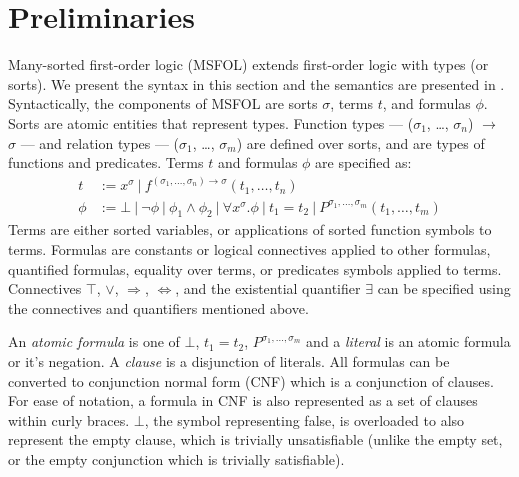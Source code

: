\documentclass[11pt]{article}
\begin{document}
\section{Preliminaries}
\label{sec:prelims}
	Many-sorted first-order logic (MSFOL)
	extends first-order logic with 
	types (or sorts). We present the 
	syntax in this section and the 
	semantics are presented in
	\cite{Barrett2018}. Syntactically, 
	the components of MSFOL are sorts 
	$\sigma$, terms $t$, and 
	formulas $\phi$. Sorts are 
	atomic entities that 
	represent types. Function types 
	--- ($\sigma_1$, \ldots, $\sigma_n$) 
	$\to$ $\sigma$ ---
	and relation types 
	--- ($\sigma_1$, \ldots, $\sigma_m$)
	are defined over sorts, and 
	are types of functions and 
	predicates. Terms $t$ and 
	formulas $\phi$ are specified as:
	\begin{align*}
	t &:= x^{\sigma}\ |\ 
	f^{(\sigma_1, \ldots, \sigma_n) \to 
		\sigma}	(t_1, \ldots, t_n)\\
	\phi &:= \bot\ |\ \neg \phi\ |\ 
	\phi_1 \land \phi_2\ |\ \forall 
	x^{\sigma} . \phi\ |\ t_1 = t_2
	\ |\ P^{\sigma_1,\ldots,\sigma_m}
	(t_1, \ldots, t_m)
	\end{align*}
	Terms are either sorted variables, 
	or applications of sorted function
	symbols to terms.
	Formulas are constants or logical 
	connectives applied to other 
	formulas, quantified formulas, 
	equality over terms, or predicates
	symbols applied to terms. Connectives 
	$\top$, $\lor$, $\Rightarrow$, 
	$\Leftrightarrow$, and the 
	existential	quantifier $\exists$ 
	can be specified using the connectives 
	and quantifiers mentioned above.
	
	An \textit{atomic formula} is one 
	of $\bot$, $t_1 = t_2$, 
	$P^{\sigma_1,\ldots,\sigma_m}$ and a 
	\textit{literal} is an atomic 
	formula or it's negation. 
	A \textit{clause} is a 
	disjunction of literals. All formulas 
	can be converted to conjunction normal 
	form (CNF) which is a conjunction of 
	clauses. For ease of notation, 
	a formula in CNF is also represented
	as a set of clauses within curly 
	braces. $\bot$, the symbol
	representing false, 
	is overloaded to also represent
	the empty clause, which is trivially
	unsatisfiable (unlike the empty set,
	or the empty conjunction which is 
	trivially satisfiable).
	
\end{document}
